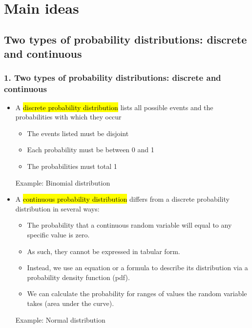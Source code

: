 \documentclass[11pt,containsverbatim,handout,xcolor=xelatex,dvipsnames,table]{beamer}
\begin{document}

\section{Main ideas}


\subsection{Two types of probability distributions: discrete and continuous}
\label{mi1}


\begin{frame}
\frametitle{1. Two types of probability distributions: discrete and continuous}

\begin{itemize}

\item A \hl{discrete probability distribution} lists all possible events and the probabilities with 
which they occur
\begin{itemize}
\item The events listed must be disjoint
\item Each probability must be between 0 and 1 
\item The probabilities must total 1
\end{itemize}
Example: Binomial distribution

\pause

\item A \hl{continuous probability distribution} differs from a discrete probability distribution in 
several ways:
\begin{itemize}
\item The probability that a continuous random variable will equal to any specific value is zero.
\item As such, they cannot be expressed in tabular form.
\item Instead, we use an equation or a formula to describe its distribution via a probability density 
function (pdf).
\item We can calculate the probability for ranges of values the random variable takes (area under 
the curve).
\end{itemize}
Example: Normal distribution

\end{itemize}

\end{frame}
\end{document}

